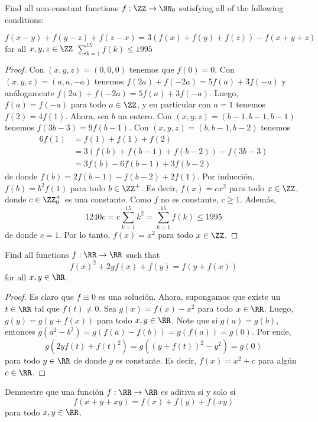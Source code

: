 \begin{probEG}
  Find all non-constant functions $f:\ZZ\to\NN_0$ satisfying all of the
  following conditions:
  \begin{enumerate}[(i)]
    \ii $f(x-y)+f(y-z)+f(z-x)=3(f(x)+f(y)+f(z))-f(x+y+z)$ for all $x,y,z\in\ZZ$
    \ii $\sum_{k=1}^{15}f(k)\le 1995$
  \end{enumerate}
\end{probEG}

\begin{proof}
  Con $(x,y,z)=(0,0,0)$ tenemos que $f(0)=0$. Con $(x,y,z)=(a,a,-a)$ tenemos
  $f(2a)+f(-2a)=5f(a)+3f(-a)$ y análogamente $f(2a)+f(-2a)=5f(a)+3f(-a)$. Luego,
  $f(a)=f(-a)$ para todo $a\in\ZZ$, y en particular con $a=1$ tenemos
  $f(2)=4f(1)$. Ahora, sea $b$ un entero. Con $(x,y,z)=(b-1,b-1,b-1)$ tenemos
  $f(3b-3)=9f(b-1)$. Con $(x,y,z)=(b,b-1,b-2)$ tenemos
  \begin{align*}
    6f(1)
    &= f(1)+f(1)+f(2) \\
    &= 3(f(b)+f(b-1)+f(b-2))-f(3b-3) \\
    &= 3f(b)-6f(b-1)+3f(b-2)
  \end{align*}
  de donde $f(b)=2f(b-1)-f(b-2)+2f(1)$. Por inducción, $f(b)=b^2f(1)$ para todo
  $b\in\ZZ^+$. Es decir, $f(x)=cx^2$ para todo $x\in\ZZ$, donde $c\in\ZZ^+_0$ es
  una constante. Como $f$ no es constante, $c\ge 1$. Además,
  \[1240c=c\sum_{k=1}^{15}k^2=\sum_{k=1}^{15}f(k)\le 1995\]
  de donde $c=1$. Por lo tanto, $f(x)=x^2$ para todo $x\in\ZZ$.
\end{proof}

\begin{probMG}
  Find all functions $f:\RR\to\RR$ such that
  \[f(x)^2+2yf(x)+f(y)=f(y+f(x))\]
  for all $x,y\in\RR$.
\end{probMG}

\begin{proof}
  Es claro que $f\equiv 0$ es una solución. Ahora, supongamos que existe un
  $t\in\RR$ tal que $f(t)\ne 0$.
  Sea $g(x)=f(x)-x^2$ para todo $x\in\RR$. Luego, $g(y)=g(y+f(x))$ para todo
  $x,y\in\RR$. Note que si $g(a)=g(b)$, entonces
  $g(a^2-b^2)=g(f(a)-f(b))=g(f(a))=g(0)$. Por ende,
  \[g(2yf(t)+f(t)^2)=g((y+f(t))^2-y^2)=g(0)\]
  para todo $y\in\RR$ de donde $g$ es constante. Es decir, $f(x)=x^2+c$ para
  algún $c\in\RR$.
\end{proof}

\begin{probEG}
  Demuestre que una función $f:\RR\to\RR$ es aditiva si y solo si
  \[f(x+y+xy)=f(x)+f(y)+f(xy)\]
  para todo $x,y\in\RR$.
\end{probEG}

